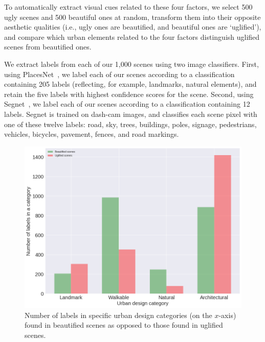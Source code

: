 To automatically extract visual cues related to these four factors, we select 500 ugly scenes and 500 beautiful ones at random, transform them into their opposite aesthetic qualities (i.e., ugly ones are beautified, and beautiful ones are `uglified'), and compare which urban elements related to the four factors distinguish uglified scenes from beautified ones. 

We extract labels from each of our 1,000 scenes using two image classifiers. First, using PlacesNet~\cite{zhou2014learning}, we label each of our scenes according to a classification containing 205 labels (reflecting, for example, landmarks, natural elements), and retain the five labels with highest confidence scores for the scene. Second, using Segnet~\cite{badrinarayanan2015segnet}, we  label each of our scenes according to a classification containing 12 labels. Segnet is trained on dash-cam images, and classifies each scene pixel with one of these twelve labels: road, sky, trees,  buildings, poles, signage, pedestrians, vehicles, bicycles, pavement, fences, and road markings. 

\begin{figure}[h]
	\centering
	\includegraphics[width=\columnwidth]{Plot/taxonomyCount.png}
	\caption{Number of labels in specific urban design categories (on the $x$-axis) found in beautified scenes as opposed to those found in uglified scenes.}
	\label{fig:taxonomyCount}
\end{figure}


